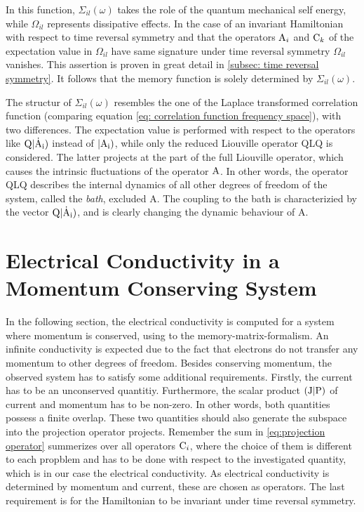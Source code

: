 In this function, $\Sigma_{il}(\omega)$ takes the role of the quantum mechanical self energy, while $\Omega_{il}$ represents dissipative effects.
In the case of an invariant Hamiltonian with respect to time reversal symmetry and that the operators $\mathrm{A}_{i}$ and $\mathrm{C}_{k}$ of the expectation value in $\Omega_{il}$ have same signature under time reversal symmetry $\Omega_{il}$ vanishes.  %
This assertion is proven in great detail in \ref{subsec: time reversal symmetry}.
It follows that the memory function is solely determined by $\Sigma_{il}(\omega)$.

The structur of $\Sigma_{il}(\omega)$ resembles the one of the Laplace transformed correlation function (comparing equation \eqref{eq: correlation function frequency space}), with two differences.
The expectation value is performed with respect to the operators like $\mathrm{Q}|\mathrm{\dot{\mathrm{A}}_{i}})$ instead of $|\mathrm{\mathrm{A}_{i}})$, while only the reduced Liouville operator QLQ is considered.  %
The latter projects at the part of the full Liouville operator, which causes the intrinsic fluctuations of the operator $\mathrm{A}$.
In other words, the operator QLQ describes the internal dynamics of all other degrees of freedom of the system, called the \emph{bath}, excluded A.
The coupling to the bath is characterizied by the vector $\mathrm{Q}|\mathrm{\dot{\mathrm{A}}_{i}})$, and is clearly changing the dynamic behaviour of A.
%
%
\section{Electrical Conductivity in a Momentum Conserving System}
\label{sec:conductivity conserved momentum}
%
%
In the following section, the electrical conductivity is computed for a system where momentum is conserved, using to the memory-matrix-formalism.
An infinite conductivity is expected due to the fact that electrons do not transfer any momentum to other degrees of freedom.
Besides conserving momentum, the observed system has to satisfy some additional requirements.
Firstly, the current has to be an unconserved quantitiy.
Furthermore, the scalar product $({\mathrm{J}}|{\mathrm{P}})$ of current and momentum has to be non-zero.
In other words, both quantities possess a finite overlap.
These two quantities should also generate the subspace into the projection operator projects.
Remember the sum in \eqref{eq:projection operator} summerizes over all operators $\mathrm{C}_{i}$, where the choice of them is different to each propblem and has to be done with respect to the investigated quantity, which is in our case the electrical conductivity.  %
As electrical conductivity is determined by momentum and current, these are chosen as operators.
The last requirement is for the Hamiltonian to be invariant under time reversal symmetry.

